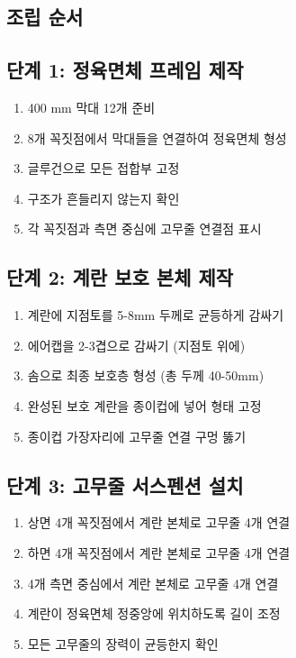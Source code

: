 \documentclass[a4paper,12pt]{article}
\begin{document}
\begin{CJK}{UTF8}{mj}
\section{조립 순서}

\subsection{단계 1: 정육면체 프레임 제작}

\begin{enumerate}
    \item 400 mm 막대 12개 준비
    \item 8개 꼭짓점에서 막대들을 연결하여 정육면체 형성
    \item 글루건으로 모든 접합부 고정
    \item 구조가 흔들리지 않는지 확인
    \item 각 꼭짓점과 측면 중심에 고무줄 연결점 표시
\end{enumerate}

\subsection{단계 2: 계란 보호 본체 제작}

\begin{enumerate}
    \item 계란에 지점토를 5-8mm 두께로 균등하게 감싸기
    \item 에어캡을 2-3겹으로 감싸기 (지점토 위에)
    \item 솜으로 최종 보호층 형성 (총 두께 40-50mm)
    \item 완성된 보호 계란을 종이컵에 넣어 형태 고정
    \item 종이컵 가장자리에 고무줄 연결 구멍 뚫기
\end{enumerate}

\subsection{단계 3: 고무줄 서스펜션 설치}

\begin{enumerate}
    \item 상면 4개 꼭짓점에서 계란 본체로 고무줄 4개 연결
    \item 하면 4개 꼭짓점에서 계란 본체로 고무줄 4개 연결
    \item 4개 측면 중심에서 계란 본체로 고무줄 4개 연결
    \item 계란이 정육면체 정중앙에 위치하도록 길이 조정
    \item 모든 고무줄의 장력이 균등한지 확인
\end{enumerate}


\end{CJK}
\end{document}
